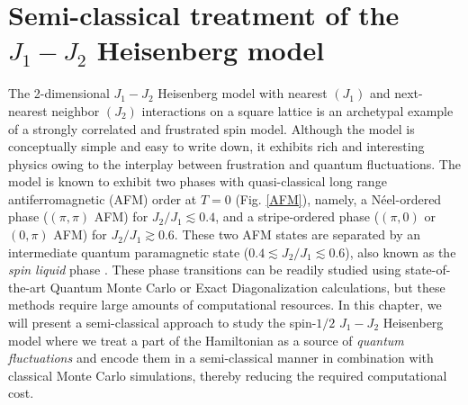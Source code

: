 \documentclass[../thesis_main.tex]{subfiles}
\begin{document}
\chapter{Semi-classical treatment of the $J_1 - J_2$ Heisenberg model}
The 2-dimensional $J_1 - J_2$ Heisenberg model with nearest $(J_1)$ and next-nearest neighbor $(J_2)$ interactions on a square lattice is an archetypal example of a strongly correlated and frustrated spin model. Although the model is conceptually simple and easy to write down, it exhibits rich and interesting physics owing to the interplay between frustration and quantum fluctuations. The model is known to exhibit two phases with quasi-classical long range antiferromagnetic (AFM) order at $T = 0$ (Fig. \ref{AFM}), namely, a Néel-ordered phase ($(\pi,\pi)$ AFM) for $J_2/J_1 \lesssim 0.4$, and a stripe-ordered phase ($(\pi, 0)$ or $(0, \pi)$ AFM) for $J_2/J_1 \gtrsim 0.6$. These two AFM states are separated by an intermediate quantum paramagnetic state ($0.4 \lesssim J_2/J_1 \lesssim 0.6$), also known as the \textit{spin liquid} phase \cite{Li_2014}. These phase transitions can be readily studied using state-of-the-art Quantum Monte Carlo or Exact Diagonalization calculations, but these methods require large amounts of computational resources. In this chapter, we will present a semi-classical approach to study the spin-$1/2$ $J_1-J_2$ Heisenberg model where we treat a part of the Hamiltonian as a source of \textit{quantum fluctuations} and encode them in a semi-classical manner in combination with classical Monte Carlo simulations, thereby reducing the required computational cost.
\end{document}
